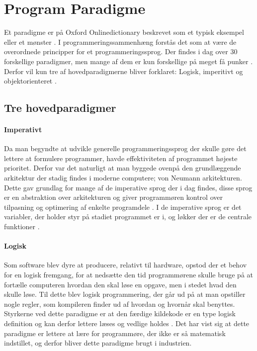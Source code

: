 \section{Program Paradigme}\label{sec:paradigmer}

Et paradigme er på Oxford Onlinedictionary beskrevet som et typisk eksempel eller et mønster \cite{Oxford_????}. I programmeringssammenhæng forstås det som at være de overordnede principper for et programmeringssprog. Der findes i dag over 30 forskellige paradigmer, men mange af dem er kun forskellige på meget få punker \cite{Roy_2009}. Derfor vil kun tre af hovedparadigmerne bliver forklaret: Logisk, imperitivt og objektorienteret \cite{Normark_2003}.

\subsection{Tre hovedparadigmer}\label{ssec:hovedparadigmer}
\paragraph{Imperativt}
Da man begyndte at udvikle generelle programmeringssprog der skulle gøre det lettere at formulere programmer, havde effektiviteten af programmet højeste prioritet. Derfor var det naturligt at man byggede ovenpå den grundlæggende arkitektur der stadig findes i moderne computere; von Neumann arkitekturen. Dette gav grundlag for mange af de imperative sprog der i dag findes, disse sprog er en abstraktion over arkitekturen og giver programmøren kontrol over tilpasning og optimering af enkelte programdele \cite[38-39]{Sebesta_2013}. I de imperative sprog er det variabler, der holder styr på stadiet programmet er i, og løkker der er de centrale funktioner \cite{Sebesta_2013}.

\paragraph{Logisk}
Som software blev dyre at producere, relativt til hardware, opstod der et behov for en logisk fremgang, for at nedsætte den tid programmørene skulle bruge på at fortælle computeren hvordan den skal løse en opgave, men i stedet hvad den skulle løse. Til dette blev logisk programmering, der går ud på at man opstiller nogle regler, som kompileren finder ud af hvordan og hvornår skal benyttes. Styrkerne ved dette paradigme er at den færdige kildekode er en type logisk definition og kan derfor lettere læses og vedlige holdes \cite[kapitel 16]{Sebesta_2013}. Det har vist sig at dette paradigme er lettere at lære for programmøre, der ikke er så matematisk indstillet, og derfor bliver dette paradigme brugt i industrien. 

